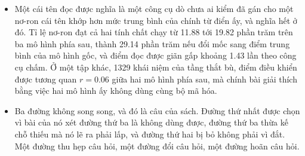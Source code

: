 \begin{tomtat}
\begin{itemize}
của nhánh này còn đòi hai thứ có trước, một bộ dữ liệu gợi ra đúng hành vi cần
xét và một chỉ số nói được rằng đã tìm thấy, tức hai lựa chọn tự do của
mục~\ref{sec:ch08-vong-lap-chung} chuyển từ đặc trưng sang thành phần.
  \item Một cái tên đọc được nghĩa là một công cụ dò chưa ai kiểm đã gán cho một
nơ-ron cái tên khớp hơn mức trung bình của chính từ điển ấy, và nghĩa hết ở đó.
Tỉ lệ nơ-ron đạt cả hai tính chất chạy từ 11.88 tới 19.82 phần trăm trên ba mô
hình phía sau, thành 29.14 phần trăm nếu đổi mốc sang điểm trung bình của mô
hình gốc, và điểm đọc được giãn gấp khoảng 1.43 lần theo công cụ chấm. Ở một tập
khác, 1329 khái niệm của tầng thắt bù, điểm điều khiển được tương quan
$r = 0.06$ giữa hai mô hình phía sau, mà chính bài giải thích bằng việc hai mô
hình ấy không dùng cùng bộ mã hóa.
  \item Ba đường không song song, và đó là câu của sách. Đường thứ nhất được
chọn vì bài của nó xét đường thứ ba là không dùng được, đường thứ ba thừa kế chỗ
thiếu mà nó lẽ ra phải lấp, và đường thứ hai bị bỏ không phải vì đắt. Một đường
thu hẹp câu hỏi, một đường đổi câu hỏi, một đường hoãn câu hỏi.
\end{itemize}
\end{tomtat}

